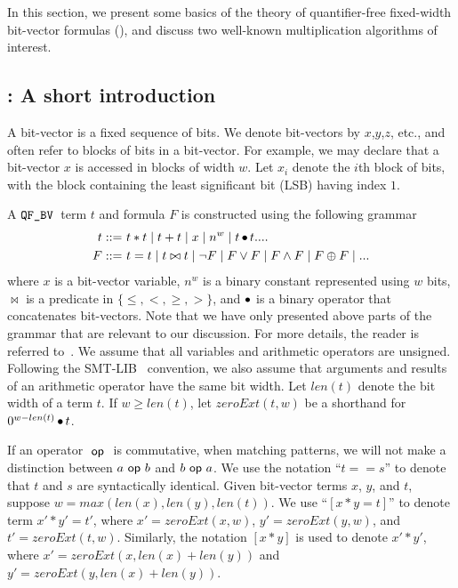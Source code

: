 In this section, we present some basics of the theory of
quantifier-free fixed-width bit-vector formulas (\qfbv), and discuss
two well-known multiplication algorithms of interest.

%

\subsection{\qfbv: A short introduction}

A bit-vector is a fixed sequence of bits.
%
We denote bit-vectors by $x$,$y$,$z$, etc., and often
%
refer to blocks of bits in a bit-vector.
%
For example, we may declare that a bit-vector $x$ is accessed in
blocks of width $w$.
%
Let $x_i$ denote the $i$th block of bits, with the block containing
the least significant bit (LSB) having index $1$.
%

A $\texttt{QF\_BV}$~term $t$ and formula $F$ is constructed using
the following grammar
\begin{align*}
t ::= &~ t * t \mid t + t \mid x \mid n^w \mid t \mathop{\bullet} t  ....\\
F ::= &~ t = t \mid t \bowtie t \mid \lnot F \mid F \lor F \mid F \land F \mid F \oplus F \mid ... 
\end{align*}
where $x$ is a bit-vector variable, $n^w$ is a binary constant
represented using $w$ bits, $\bowtie$ is a predicate in $\{\leq , <,
\geq, > \}$, and $\mathop{\bullet}$ is a binary operator that concatenates
bit-vectors.
%
Note that we have only presented above parts of the grammar
that are relevant to our discussion.  For more details,
the reader is referred to~\cite{Kroeningbook,barrett}.
%
We assume that all variables and arithmetic operators are unsigned.
Following the SMT-LIB~\cite{SMTLIB} convention, we also assume that
arguments and results of an arithmetic operator have the same bit width.
%
Let $len(t)$ denote the bit width of a term $t$.
%
If $w \geq len(t)$,
let $zeroExt(t,w)$ be a shorthand for  $0^{w-len(t)}\mathop{\bullet} t$.

If an operator $~\mathsf{op}~$ is commutative, when matching patterns, we will
not make a distinction between $a ~\mathsf{op}~ b$ and $b ~\mathsf{op}~ a$.
%
We use the notation ``$t == s$'' to denote that $t$ and $s$ are
syntactically identical.
%
Given bit-vector terms $x$, $y$, and $t$, suppose $w = max(len(x),len(y),
len(t))$.
%
We use ``$[x*y = t]$'' to denote term $x'*y'=t'$, where $x' =
zeroExt(x, w)$, $y' = zeroExt(y, w)$, and $t' = zeroExt(t, w)$.
%
Similarly, the notation $[x*y]$ is used to denote $x' * y'$, where $x'
= zeroExt(x, len(x)+len(y))$ and $y' = zeroExt(y, len(x) + len(y))$.

